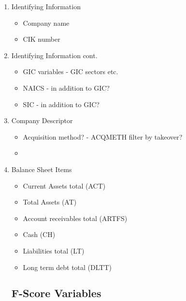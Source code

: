 \documentclass[12pt]{article}
\begin{document}
        \begin{enumerate}
        \item Identifying Information

            \begin{itemize}
                \item Company name 
                \item CIK number 
            \end{itemize}
    
        \item Identifying Information cont.  
        
            \begin{itemize}
                \item GIC variables - GIC sectors etc.
                \item NAICS - in addition to GIC? 
                \item SIC - in addition to GIC?
            \end{itemize}

        \item Company Descriptor

            \begin{itemize}
                \item Acquisition method? - ACQMETH filter by takeover? 
                \item 
            \end{itemize}
        
        \item Balance Sheet Items 

            \begin{itemize}
                \item Current Assets total (ACT)
                \item Total Assets (AT)
                \item Account receivables total (ARTFS)
                \item Cash (CH)
                \item Liabilities total (LT) 
                \item Long term debt total (DLTT)
            \end{itemize}
        
        \subsection{F-Score Variables}


\end{enumerate}
\end{document}
